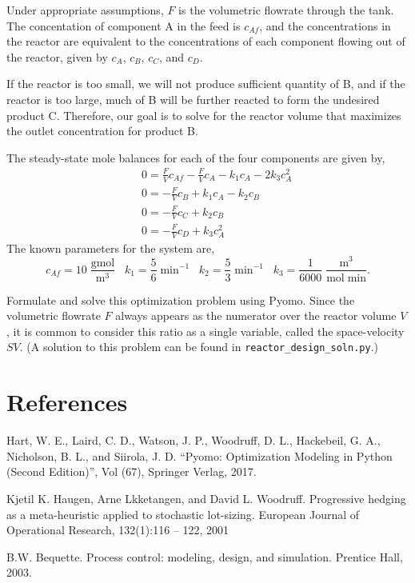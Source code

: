 \documentclass[12pt]{article}
\begin{document}
\begin{description}
Under appropriate assumptions, $F$ is the volumetric flowrate through the tank. The concentation of component A in the feed is $c_{Af}$, and the concentrations in the reactor are equivalent to the concentrations of each component flowing out of the reactor, given by $c_A$, $c_B$, $c_C$, and $c_D$.

If the reactor is too small, we will not produce sufficient quantity of B, and if the reactor
is too large, much of B will be further
reacted to form the undesired product C. Therefore, our goal is
to solve for the reactor volume that maximizes the outlet
concentration for product B.

The steady-state mole balances for each of the four components are given by,
\begin{eqnarray*}
&&0 = \frac{F}{V} c_{Af} - \frac{F}{V} c_A - k_1 c_A -2 k_3 c_A^2\\
&&0 = -\frac{F}{V} c_B + k_1 c_A - k_2 c_B \\
&&0 = -\frac{F}{V} c_C + k_2 c_B \\
&&0 = -\frac{F}{V} c_D + k_3 c_A^2
\end{eqnarray*}
The known parameters for the system are,
\[
c_{Af}=10 \; \frac{\mbox{gmol}}{\mbox{m}^3} \;\;\; k_1{=} \frac{5}{6} \; \mbox{min}^{-1} \;\;\; k_2{=} \frac{5}{3} \; \mbox{min}^{-1} \;\;\; k_3{=} \frac{1}{6000} \; \frac{\mbox{m}^3}{ \mbox{mol}\; \mbox{min}}.
\]

Formulate and solve this optimization problem using Pyomo. Since the volumetric flowrate $F$ always appears as the numerator over the reactor volume $V$, it is common to consider this ratio
as a single variable, called the space-velocity $SV$. (A solution to this problem can be found in {\tt reactor\_design\_soln.py}.)
\end{description}



\section*{References}
Hart, W. E., Laird, C. D., Watson, J. P., Woodruff, D. L., Hackebeil, G. A., Nicholson, B. L., and Siirola, J. D. “Pyomo: Optimization Modeling in Python (Second Edition)”, Vol (67), Springer Verlag, 2017.

Kjetil K. Haugen, Arne Lkketangen, and David L. Woodruff. Progressive
hedging as a meta-heuristic applied to stochastic lot-sizing. European Journal
of Operational Research, 132(1):116 – 122, 2001

B.W. Bequette. Process control: modeling, design, and simulation. Prentice
Hall, 2003.
\end{document}
